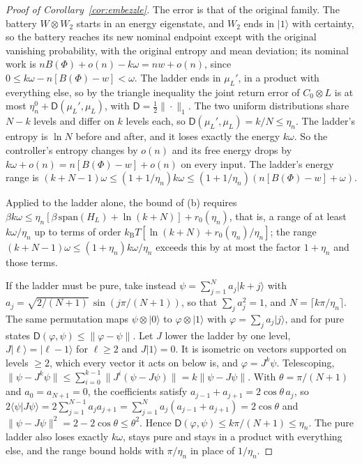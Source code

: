 \documentclass[11pt]{article}
\theoremstyle{definition}
\theoremstyle{remark}
\newcommand{\kB}{k_{\mathrm B}}
\providecommand{\D}{\mathsf D}
\begin{document}
\begin{proof}[Proof of Corollary~\ref{cor:embezzle}]
The error is that of the original family. The battery $W\otimes W_2$ starts in an energy eigenstate, and $W_2$ ends in $|1\rangle$ with certainty, so the battery reaches its new nominal endpoint except with the original vanishing probability, with the original entropy and mean deviation; its nominal work is $nB(\Phi)+o(n)-k\omega=nw+o(n)$, since $0\le k\omega-n[B(\Phi)-w]<\omega$. The ladder ends in $\mu_L'$, in a product with everything else, so by the triangle inequality the joint return error of $C_0\otimes L$ is at most $\eta^0_n+\D(\mu_L',\mu_L)$, with $\D=\frac12\|\cdot\|_1$. The two uniform distributions share $N-k$ levels and differ on $k$ levels each, so $\D(\mu_L',\mu_L)=k/N\le\eta_n$. The ladder's entropy is $\ln N$ before and after, and it loses exactly the energy $k\omega$. So the controller's entropy changes by $o(n)$ and its free energy drops by $k\omega+o(n)=n[B(\Phi)-w]+o(n)$ on every input. The ladder's energy range is $(k+N-1)\omega\le(1+1/\eta_n)k\omega\le(1+1/\eta_n)(n[B(\Phi)-w]+\omega)$.

Applied to the ladder alone, the bound of (b) requires $\beta k\omega\le\eta_n[\beta\,\mathrm{span}(H_L)+\ln(k+N)]+r_0(\eta_n)$, that is, a range of at least $k\omega/\eta_n$ up to terms of order $\kB T[\ln(k+N)+r_0(\eta_n)/\eta_n]$; the range $(k+N-1)\omega\le(1+\eta_n)k\omega/\eta_n$ exceeds this by at most the factor $1+\eta_n$ and those terms.

If the ladder must be pure, take instead $\psi=\sum_{j=1}^Na_j|k+j\rangle$ with $a_j=\sqrt{2/(N+1)}\,\sin(j\pi/(N+1))$, so that $\sum_ja_j^2=1$, and $N=\lceil k\pi/\eta_n\rceil$. The same permutation maps $\psi\otimes|0\rangle$ to $\varphi\otimes|1\rangle$ with $\varphi=\sum_ja_j|j\rangle$, and for pure states $\D(\varphi,\psi)\le\|\varphi-\psi\|$. Let $J$ lower the ladder by one level, $J|\ell\rangle=|\ell-1\rangle$ for $\ell\ge2$ and $J|1\rangle=0$. It is isometric on vectors supported on levels $\ge2$, which every vector it acts on below is, and $\varphi=J^k\psi$. Telescoping, $\|\psi-J^k\psi\|\le\sum_{i=0}^{k-1}\|J^i(\psi-J\psi)\|=k\|\psi-J\psi\|$. With $\theta=\pi/(N+1)$ and $a_0=a_{N+1}=0$, the coefficients satisfy $a_{j-1}+a_{j+1}=2\cos\theta\,a_j$, so $2\langle\psi|J\psi\rangle=2\sum_{j=1}^{N-1}a_ja_{j+1}=\sum_{j=1}^Na_j(a_{j-1}+a_{j+1})=2\cos\theta$ and $\|\psi-J\psi\|^2=2-2\cos\theta\le\theta^2$. Hence $\D(\varphi,\psi)\le k\pi/(N+1)\le\eta_n$. The pure ladder also loses exactly $k\omega$, stays pure and stays in a product with everything else, and the range bound holds with $\pi/\eta_n$ in place of $1/\eta_n$.
\end{proof}
\end{document}
